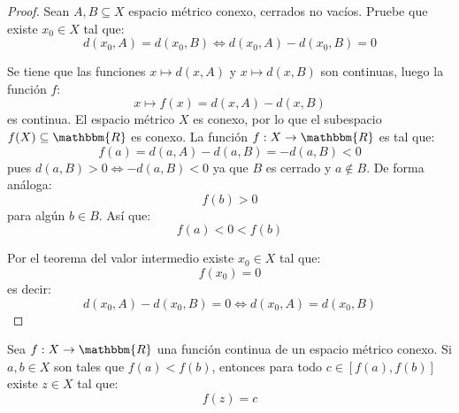 \documentclass[12pt]{report}
\theoremstyle{largebreak}
\newcommand\cf[3]{\ensuremath{#1:#2\rightarrow#3}}
\newcommand{\bbm}[1]{\ensuremath{\mathbbm{#1}}}
\begin{document}
    \begin{proof}
        Sean $A,B\subseteq X$ espacio métrico conexo, cerrados no vacíos. Pruebe que existe $x_0\in X$ tal que:
        \begin{equation*}
            d(x_0,A)=d(x_0,B)\iff d(x_0,A)-d(x_0,B)=0
        \end{equation*}

        Se tiene que las funciones $x\mapsto d(x,A)$ y $x\mapsto d(x,B)$ son continuas, luego la función $f$:
        \begin{equation*}
            x\mapsto f(x)=d(x,A)-d(x,B)
        \end{equation*}
        es continua. El espacio métrico $X$ es conexo, por lo que el subespacio $f(X)\subseteq\bbm{R}$ es conexo. La función $\cf{f}{X}{\bbm{R}}$ es tal que:
        \begin{equation*}
            f(a)=d(a,A)-d(a,B)=-d(a,B)<0
        \end{equation*}
        pues $d(a,B)>0\iff -d(a,B)<0$ ya que $B$ es cerrado y $a\notin B$. De forma análoga:
        \begin{equation*}
            f(b)>0
        \end{equation*}
        para algún $b\in B$. Así que:
        \begin{equation*}
            f(a)<0<f(b)
        \end{equation*}
        
        Por el teorema del valor intermedio existe $x_0\in X$ tal que:
        \begin{equation*}
            f(x_0)=0
        \end{equation*}
        es decir:
        \begin{equation*}
            d(x_0,A)-d(x_0,B)=0\iff d(x_0,A)=d(x_0,B)
        \end{equation*}
    \end{proof}

    \begin{theor}
        Sea $\cf{f}{X}{\bbm{R}}$ una función continua de un espacio métrico conexo. Si $a,b\in X$ son tales que $f(a)<f(b)$, entonces para todo $c\in[f(a),f(b)]$ existe $z\in X$ tal que:
        \begin{equation*}
            f(z)=c
        \end{equation*}
    \end{theor}
\end{document}
